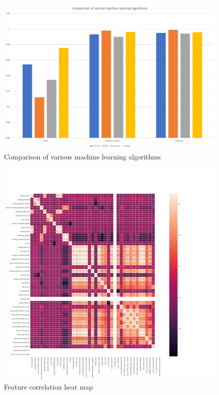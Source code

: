\begin{figure}[htb]
	\centering
	\includegraphics[width=1\textwidth]{images/ml_comparison.png}
	\caption{Comparison of various machine learning algorithms} 
	\label{fig:ml_comparison}
\end{figure}

\begin{figure}[htb]
	\centering
	\includegraphics[width=1.2\textwidth]{images/heatmap.png}
	\caption{Feature correlation heat map} 
	\label{fig:heatmap}
\end{figure}

